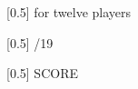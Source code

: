 \documentclass[11pt]{report}
\begin{document}
\begin{titlepage}
        \vspace*{5\baselineskip}
\begin{center}
        {
            \scalebox{0.5}[0.5]
            {\fontsize{2cm}{1em}\selectfont for twelve players}
        }
\end{center}
        \vspace*{1\baselineskip}
\begin{center}
        {
            \scalebox{0.5}[0.5]
            {\fontsize{2cm}{1em}/19}
        }
\end{center}
        \vspace*{30\baselineskip}
\begin{center}
        {
            \scalebox{0.5}[0.5]
            {\fontsize{2cm}{1em}\selectfont SCORE}
        }
\end{center}

    \end{titlepage}
\end{document}
